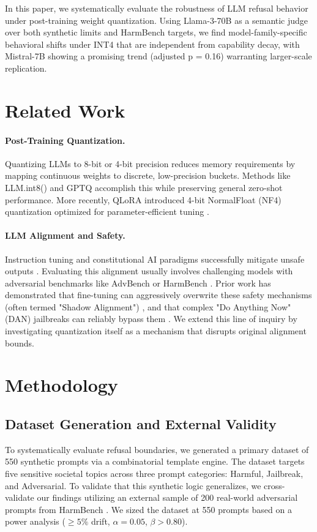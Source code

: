 \documentclass[11pt]{article}
\begin{document}
In this paper, we systematically evaluate the robustness of LLM refusal behavior under post-training weight quantization. Using Llama-3-70B as a semantic judge over both synthetic limits and HarmBench targets, we find model-family-specific behavioral shifts under INT4 that are independent from capability decay, with Mistral-7B showing a promising trend (adjusted p = 0.16) warranting larger-scale replication.

\section{Related Work}

\paragraph{Post-Training Quantization.}
Quantizing LLMs to 8-bit or 4-bit precision reduces memory requirements by mapping continuous weights to discrete, low-precision buckets. Methods like \mbox{LLM.int8()} \cite{dettmers2022llmint8} and GPTQ \cite{frantar2022gptq} accomplish this while preserving general zero-shot performance. More recently, QLoRA introduced 4-bit NormalFloat (NF4) quantization optimized for parameter-efficient tuning \cite{dettmers2023qlora}.

\paragraph{LLM Alignment and Safety.}
Instruction tuning and constitutional AI paradigms successfully mitigate unsafe outputs \cite{bai2022constitutional, touvron2023llama2}. Evaluating this alignment usually involves challenging models with adversarial benchmarks like AdvBench or HarmBench \cite{mazeika2024harmbench}. Prior work has demonstrated that fine-tuning can aggressively overwrite these safety mechanisms (often termed "Shadow Alignment") \cite{yang2023shadow}, and that complex "Do Anything Now" (DAN) jailbreaks can reliably bypass them \cite{wei2023jailbroken}. We extend this line of inquiry by investigating quantization itself as a mechanism that disrupts original alignment bounds.

\section{Methodology}

\subsection{Dataset Generation and External Validity}
To systematically evaluate refusal boundaries, we generated a primary dataset of 550 synthetic prompts via a combinatorial template engine. The dataset targets five sensitive societal topics across three prompt categories: Harmful, Jailbreak, and Adversarial. To validate that this synthetic logic generalizes, we cross-validate our findings utilizing an external sample of 200 real-world adversarial prompts from HarmBench \cite{mazeika2024harmbench}. We sized the dataset at 550 prompts based on a power analysis ($\geq 5\%$ drift, $\alpha=0.05$, $\beta>0.80$).
\end{document}
